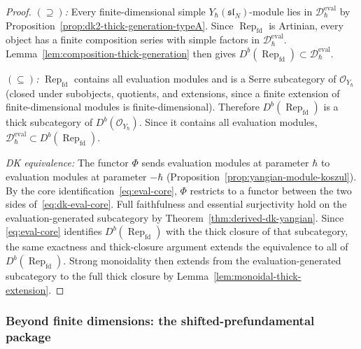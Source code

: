 \begin{proof}
\emph{$(\supseteq)$:}
Every finite-dimensional simple $Y_\hbar(\mathfrak{sl}_N)$-module
lies in $\mathcal{D}_\hbar^{\mathrm{eval}}$ by
Proposition~\ref{prop:dk2-thick-generation-typeA}.
Since $\operatorname{Rep}_{\mathrm{fd}}$ is Artinian, every
object has a finite composition series with simple factors in
$\mathcal{D}_\hbar^{\mathrm{eval}}$.
Lemma~\ref{lem:composition-thick-generation} then gives
$D^b(\operatorname{Rep}_{\mathrm{fd}}) \subset
\mathcal{D}_\hbar^{\mathrm{eval}}$.

\emph{$(\subseteq)$:}
$\operatorname{Rep}_{\mathrm{fd}}$ contains all evaluation modules
and is a Serre subcategory of $\mathcal{O}_{Y_\hbar}$ (closed under
subobjects, quotients, and extensions, since a finite extension of
finite-dimensional modules is finite-dimensional). Therefore
$D^b(\operatorname{Rep}_{\mathrm{fd}})$ is a thick subcategory of
$D^b(\mathcal{O}_{Y_\hbar})$. Since it contains all evaluation
modules, $\mathcal{D}_\hbar^{\mathrm{eval}} \subset
D^b(\operatorname{Rep}_{\mathrm{fd}})$.

\emph{DK equivalence:}
The functor $\Phi$ sends evaluation modules at parameter
$\hbar$ to evaluation modules at parameter $-\hbar$
(Proposition~\ref{prop:yangian-module-koszul}). By the core
identification~\eqref{eq:eval-core}, $\Phi$ restricts to a functor
between the two sides of~\eqref{eq:dk-eval-core}.
Full faithfulness and essential surjectivity hold on the
evaluation-generated subcategory by
Theorem~\ref{thm:derived-dk-yangian}. Since
\eqref{eq:eval-core} identifies $D^b(\operatorname{Rep}_{\mathrm{fd}})$
with the thick closure of that subcategory, the same exactness and
thick-closure argument extends the equivalence to all of
$D^b(\operatorname{Rep}_{\mathrm{fd}})$. Strong monoidality then
extends from the evaluation-generated subcategory to the full thick
closure by Lemma~\ref{lem:monoidal-thick-extension}.
\end{proof}

\subsubsection*{Beyond finite dimensions: the shifted-prefundamental package}

